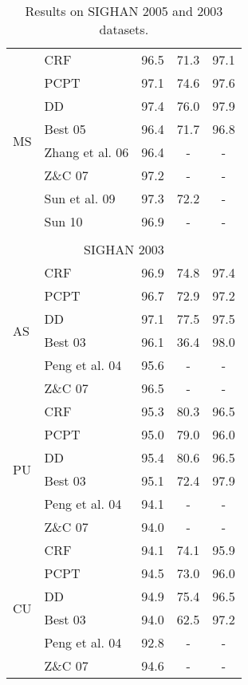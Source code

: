 \begin{table}
\begin{small}
\begin{tabular}{ l | l | c | c | c   }
\multirow{8}{*}{MS} &  CRF        &  96.5  & 71.3 & 97.1 \\
& PCPT &  97.1  & 74.6 & 97.6 \\
& DD &  {97.4}  & {76.0} & {97.9} \\
\cline{2-5}
& Best 05    &  96.4  &   71.7 &   96.8 \\
& Zhang et al. 06      & 96.4 &   - & - \\
& Z\&C 07      & 97.2 &   - & - \\
& Sun et al. 09  & 97.3  &   72.2  & - \\
& Sun 10  & 96.9  &   -  & - \\
\hline

\multicolumn{5}{c}{} \\
\multicolumn{5}{c}{\large{SIGHAN 2003}} \\
\hline

\multirow{6}{*}{AS} & CRF   & 96.9  & 74.8 &  97.4 \\
& PCPT & 96.7  & 72.9  & 97.2 \\
& DD & {97.1}  & {77.5}  & 97.5 \\
\cline{2-5}
 &  Best 03    &  96.1  & 36.4 &  {98.0} \\
  & Peng et al. 04      & 95.6 &   - & - \\
 & Z\&C 07      & 96.5 &   - & - \\

\hline
\multirow{6}{*}{PU}  & CRF   & 95.3  & 80.3	 & 96.5 \\
& PCPT &  95.0  & 79.0  & 96.0 \\
& DD & {95.4}	  & {80.6} & 96.5 \\
\cline{2-5}
&  Best 03       &  95.1  & 72.4 & {97.9} \\
& Peng et al. 04      & 94.1 &   - & - \\
& Z\&C 07      & 94.0 &   - & - \\

\hline
\multirow{6}{*}{CU} & CRF   & 94.1   & 74.1   & 95.9 \\
& PCPT  & 94.5   & 73.0  &  96.0 \\
& DD &  {94.9}  & {75.4} &  96.5 \\
\cline{2-5}
&  Best 03   & 94.0   &  62.5  &  {97.2} \\
& Peng et al. 04      & 92.8 &   - & - \\
& Z\&C 07      & 94.6 &   - & - \\


\end{tabular} 
\caption{Results on SIGHAN 2005 and 2003 datasets. }\label{tbl:results}
\end{small}
\end{table}

